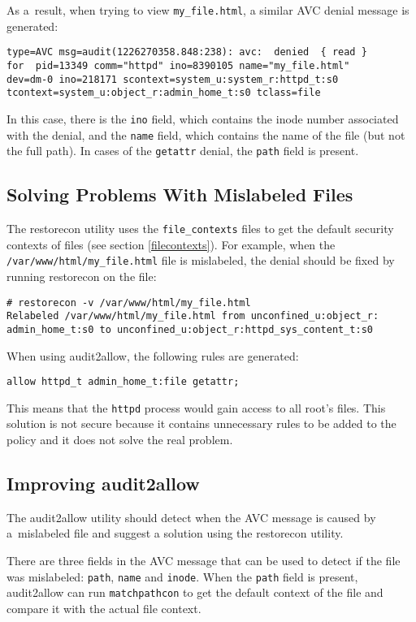 As a~result, when trying to view \texttt{my\_file.html}, a similar AVC denial
message is generated:
\begin{lstlisting}
type=AVC msg=audit(1226270358.848:238): avc:  denied  { read }
for  pid=13349 comm="httpd" ino=8390105 name="my_file.html"
dev=dm-0 ino=218171 scontext=system_u:system_r:httpd_t:s0
tcontext=system_u:object_r:admin_home_t:s0 tclass=file
\end{lstlisting}
In this case, there is the \texttt{ino} field, which contains the inode number
associated with the denial, and the \texttt{name} field, which contains the name
of the file (but not the full path). In cases of the \texttt{getattr} denial,
the \texttt{path} field is present.

\subsection{Solving Problems With Mislabeled Files}
The restorecon utility uses the \texttt{file\_contexts} files to get the default
security contexts of files (see section \ref{filecontexts}). For example, when
the \texttt{/var/www/html/my\_file.html} file is mislabeled, the denial should
be fixed by running restorecon on the file:
\begin{lstlisting}
# restorecon -v /var/www/html/my_file.html
Relabeled /var/www/html/my_file.html from unconfined_u:object_r:
admin_home_t:s0 to unconfined_u:object_r:httpd_sys_content_t:s0
\end{lstlisting}

When using audit2allow, the following rules are generated:
\begin{lstlisting}
allow httpd_t admin_home_t:file getattr;
\end{lstlisting}
This means that the \texttt{httpd} process would gain access to all root's
files. This solution is not secure because it contains unnecessary rules to be
added to the policy and it does not solve the real problem.

\subsection{Improving audit2allow}
The audit2allow utility should detect when the AVC message is caused by
a~mislabeled file and suggest a solution using the restorecon utility.

There are three fields in the AVC message that can be used to detect if the file
was mislabeled: \texttt{path}, \texttt{name} and \texttt{inode}. When the
\texttt{path} field is present, audit2allow can run \texttt{matchpathcon} to get
the default context of the file and compare it with the actual file context.

